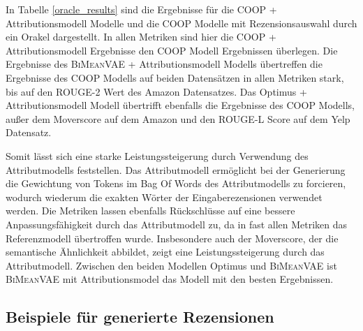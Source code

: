In Tabelle \ref{oracle_results} sind die Ergebnisse für die COOP + Attributionsmodell Modelle und die COOP Modelle mit Rezensionsauswahl durch ein Orakel dargestellt.
In allen Metriken sind hier die COOP + Attributionsmodell Ergebnisse den COOP Modell Ergebnissen überlegen. 
Die Ergebnisse des \textsc{BiMeanVAE} + Attributionsmodell Modells übertreffen die Ergebnisse des COOP Modells auf beiden Datensätzen in allen Metriken stark, bis auf den ROUGE-2 Wert des Amazon Datensatzes.
Das Optimus + Attributionsmodell Modell übertrifft ebenfalls die Ergebnisse des COOP Modells, außer dem Moverscore auf dem Amazon und den ROUGE-L Score auf dem Yelp Datensatz.

Somit lässt sich eine starke Leistungssteigerung durch Verwendung des Attributmodells feststellen. 
Das Attributmodell ermöglicht bei der Generierung die Gewichtung von Tokens im Bag Of Words des Attributmodells zu forcieren, wodurch wiederum die exakten Wörter der Eingaberezensionen verwendet werden.
Die Metriken lassen ebenfalls Rückschlüsse auf eine bessere Anpassungsfähigkeit durch das Attributmodell zu, da in fast allen Metriken das Referenzmodell übertroffen wurde.
Insbesondere auch der Moverscore, der die semantische Ähnlichkeit abbildet, zeigt eine Leistungssteigerung durch das Attributmodell.
Zwischen den beiden Modellen Optimus und \textsc{BiMeanVAE} ist \textsc{BiMeanVAE} mit Attributionsmodel das Modell mit den besten Ergebnissen.

\subsection{Beispiele für generierte Rezensionen}
\label{example}


\small
\newlength{\DepthReference}
\setlength{\DepthReference}{1pt}%

\newlength{\HeightReference}
\setlength{\HeightReference}{7pt}


\newlength{\Width}%

\newcommand{\ccolorbox}[2][red]%
{%
    \settowidth{\Width}{#2}%
    \setlength{\fboxsep}{1pt}%
    \colorbox{#1}%
    {%
        \raisebox{-\DepthReference}%
        {%
                \parbox[b][\HeightReference+\DepthReference][c]{\Width}{\centering#2}%
        }%
    }%
}



